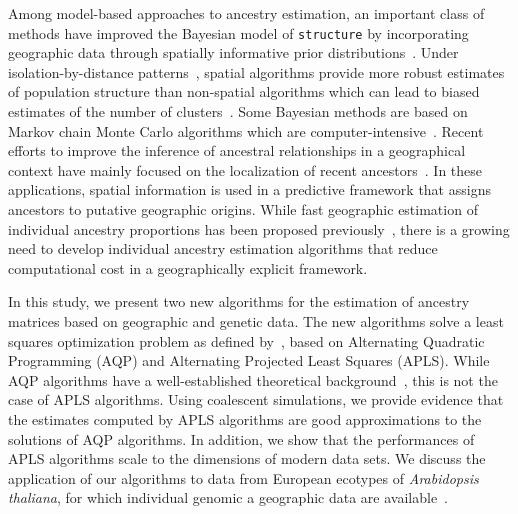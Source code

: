 Among model-based approaches to ancestry estimation, an important class of
methods have improved the Bayesian model of {\tt structure} by incorporating
geographic data through spatially informative prior
distributions~\citep{Chen2007, Corander2008}. Under isolation-by-distance
patterns~\citep{Wright1943, Malecot1948}, spatial algorithms provide more robust
estimates of population structure than non-spatial algorithms which can lead to
biased estimates of the number of clusters~\citep{Durand2009}. Some Bayesian
methods are based on Markov chain Monte Carlo algorithms which are
computer-intensive~\citep{Francois2010}. Recent efforts to improve the inference
of ancestral relationships in a geographical context have mainly focused on the
localization of recent ancestors~\citep{Baran2013, Lao2014, Yang2014,
  bhaskar2016, ranola2014}. In these applications, spatial information is used
in a predictive framework that assigns ancestors to putative geographic origins.
While fast geographic estimation of individual ancestry proportions has been
proposed previously~\citep{Caye2016, bradburd2016}, there is a growing need to
develop individual ancestry estimation algorithms that reduce computational cost
in a geographically explicit framework.

 In this study, we present two new algorithms for the estimation of ancestry
 matrices based on geographic and genetic data. The new algorithms solve a least
 squares optimization problem as defined by~\cite{Caye2016}, based on
 Alternating Quadratic Programming (AQP) and Alternating Projected Least Squares
 (APLS). While AQP algorithms have a well-established theoretical
 background~\citep{Bertsekas1995}, this is not the case of APLS algorithms.
 Using coalescent simulations, we provide evidence that the estimates computed
 by APLS algorithms are good approximations to the solutions of AQP algorithms.
 In addition, we show that the performances of APLS algorithms scale to the
 dimensions of modern data sets. We discuss the application of our algorithms to
 data from European ecotypes of {\it Arabidopsis thaliana}, for which individual
 genomic a geographic data are available~\citep{Horton2012}.



